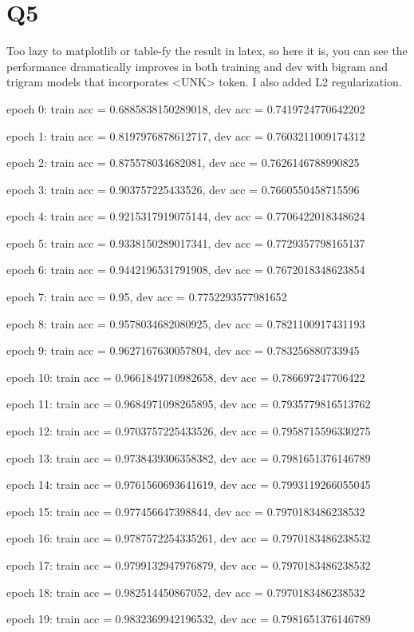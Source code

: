 \documentclass[11pt]{article}
\begin{document}
\section*{Q5}

Too lazy to matplotlib or table-fy the result in latex, so here it is, you can see the performance dramatically improves in both training and dev with bigram and trigram models that incorporates <UNK>
token. I also added L2 regularization.

epoch 0: train acc = 0.6885838150289018, dev acc = 0.7419724770642202

epoch 1: train acc = 0.8197976878612717, dev acc = 0.7603211009174312

epoch 2: train acc = 0.875578034682081, dev acc = 0.7626146788990825

epoch 3: train acc = 0.903757225433526, dev acc = 0.7660550458715596

epoch 4: train acc = 0.9215317919075144, dev acc = 0.7706422018348624

epoch 5: train acc = 0.9338150289017341, dev acc = 0.7729357798165137

epoch 6: train acc = 0.9442196531791908, dev acc = 0.7672018348623854

epoch 7: train acc = 0.95, dev acc = 0.7752293577981652

epoch 8: train acc = 0.9578034682080925, dev acc = 0.7821100917431193

epoch 9: train acc = 0.9627167630057804, dev acc = 0.783256880733945

epoch 10: train acc = 0.9661849710982658, dev acc = 0.786697247706422

epoch 11: train acc = 0.9684971098265895, dev acc = 0.7935779816513762

epoch 12: train acc = 0.9703757225433526, dev acc = 0.7958715596330275

epoch 13: train acc = 0.9738439306358382, dev acc = 0.7981651376146789

epoch 14: train acc = 0.9761560693641619, dev acc = 0.7993119266055045

epoch 15: train acc = 0.977456647398844, dev acc = 0.7970183486238532

epoch 16: train acc = 0.9787572254335261, dev acc = 0.7970183486238532

epoch 17: train acc = 0.9799132947976879, dev acc = 0.7970183486238532

epoch 18: train acc = 0.982514450867052, dev acc = 0.7970183486238532

epoch 19: train acc = 0.9832369942196532, dev acc = 0.7981651376146789 
\end{document}
